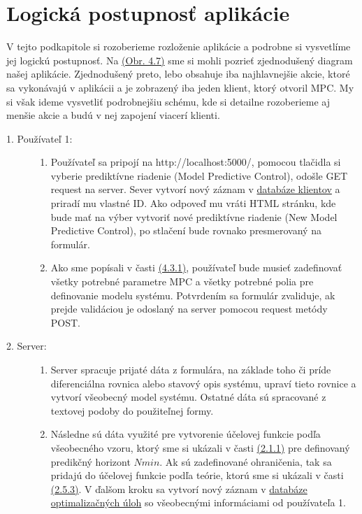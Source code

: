 \section{Logická postupnosť aplikácie}
V tejto podkapitole si rozoberieme rozloženie aplikácie a podrobne si vysvetlíme jej logickú postupnosť. Na \hyperref[fig:ArchitekturaAPK]{(Obr. 4.7)} sme si mohli pozrieť zjednodušený diagram našej aplikácie. Zjednodušený preto, lebo obsahuje iba najhlavnejšie akcie, ktoré sa vykonávajú v aplikácii a je zobrazený iba jeden klient, ktorý otvoril MPC. My si však ideme vysvetliť podrobnejšiu schému, kde si detailne rozoberieme aj menšie akcie a budú v nej zapojení viacerí klienti.
\begin{description}
\item[1. Používateľ 1:]{\hfill
	\begin{enumerate}
		\item{
			Používateľ sa pripojí na http://localhost:5000/, pomocou tlačidla si vyberie prediktívne riadenie (Model Predictive Control), odošle GET request na server. Sever vytvorí nový záznam v \hyperref[DB:Klient]{databáze klientov} a priradí mu vlastné ID. Ako odpoveď mu vráti HTML stránku, kde bude mať na výber vytvoriť nové prediktívne riadenie (New Model Predictive Control), po stlačení bude rovnako presmerovaný na formulár.
		}
		\item{
			Ako sme popísali v časti \hyperref[subse:Formular]{(4.3.1)}, používateľ bude musieť zadefinovať všetky potrebné parametre MPC a všetky potrebné polia pre definovanie modelu systému. Potvrdením sa formulár zvaliduje, ak prejde validáciou je odoslaný na server pomocou request metódy POST.
		}
	\end{enumerate}
}
\item[2. Server:]{\hfill
	\begin{enumerate}
		\item{
			Server spracuje prijaté dáta z formulára, na základe toho či príde diferenciálna rovnica alebo stavový opis systému, upraví tieto rovnice a vytvorí všeobecný model systému. Ostatné dáta sú spracované z textovej podoby do použiteľnej formy.
		}
		\item{
			Následne sú dáta využité pre vytvorenie účelovej funkcie podľa všeobecného vzoru, ktorý sme si ukázali v časti \hyperref[subse:MPC]{(2.1.1)} pre definovaný predikčný horizont $Nmin$. Ak sú zadefinované ohraničenia, tak sa pridajú do účelovej funkcie podľa teórie, ktorú sme si ukázali v časti \hyperref[subse:Ohranicenia]{(2.5.3)}. V ďalšom kroku sa vytvorí nový záznam v \hyperref[DB:OPT]{databáze optimalizačných úloh} so všeobecnými informáciami od používateľa 1.
}
\end{enumerate}}
\end{description}
